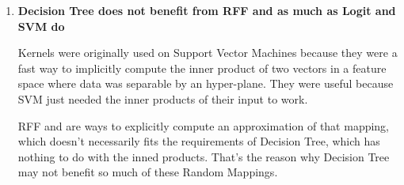 \begin{pre-delivery}
\begin{enumerate}
    It is possible that for some models, this is too much randomization of
    the data, and it coud have a bad effect on the learning process.

    \item \textbf{Decision Tree does not benefit from RFF and \Nys as much as
    Logit and SVM do}

    Kernels were originally used on Support Vector Machines because they were
    a fast way to implicitly compute the inner product of two vectors in a
    feature space where data was separable by an hyper-plane. They were
    useful because SVM just needed the inner products of their input to work.

    RFF and \Nys are ways to explicitly compute an approximation of that
    mapping, which doesn't necessarily fits the requirements of Decision Tree,
    which has nothing to do with the inned products. That's the reason why
    Decision Tree may not benefit so much of these Random Mappings.
  \end{enumerate}
\end{pre-delivery}
